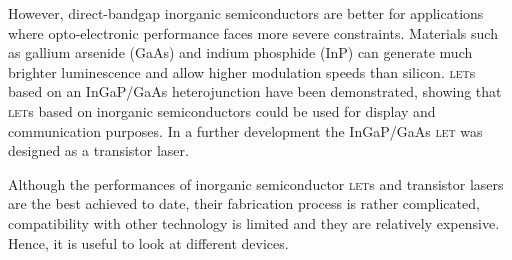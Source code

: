 However, direct-bandgap inorganic semiconductors are better for applications where opto-electronic performance faces more severe constraints. Materials such as gallium arsenide (GaAs) and indium phosphide (InP) can generate much brighter luminescence and allow higher modulation speeds than silicon. \textsc{let}s based on an InGaP/GaAs heterojunction have been demonstrated, showing that \textsc{let}s based on inorganic semiconductors could be used for display and communication purposes. In a further development the InGaP/GaAs \textsc{let} was designed as a transistor laser.

Although the performances of inorganic semiconductor \textsc{let}s and transistor lasers are the best achieved to date, their fabrication process is rather complicated, compatibility with other technology is limited and they are relatively expensive. Hence, it is useful to look at different devices.
